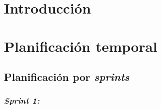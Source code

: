 
\section{Introducción}

\section{Planificación temporal}

\subsection{Planificación por \textit{sprints}}


\subsubsection{\textit{Sprint 1:}}

